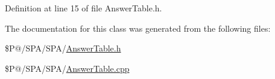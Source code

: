 Definition at line 15 of file Answer\-Table.\-h.



The documentation for this class was generated from the following files\-:\begin{DoxyCompactItemize}
\item 
\$\-P@/\-S\-P\-A/\-S\-P\-A/\hyperlink{_answer_table_8h}{Answer\-Table.\-h}\item 
\$\-P@/\-S\-P\-A/\-S\-P\-A/\hyperlink{_answer_table_8cpp}{Answer\-Table.\-cpp}\end{DoxyCompactItemize}
